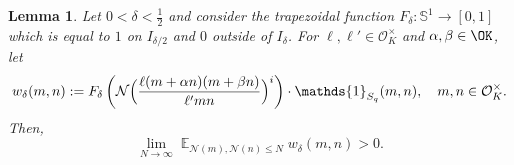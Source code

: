 \documentclass[11pt]{amsart}
\newtheorem{lemma}{Lemma}[section]
\theoremstyle{definition}
\DeclareMathOperator*{\E}{\mathbb{E}}
\newcommand{\NN}{{\mathcal N}}
\renewcommand{\S}{\mathbb{S}}
\begin{document}
\begin{lemma}\label{weights}
Let $0<\delta<\frac{1}{2}$ and consider the trapezoidal function $F_{\delta}: \S^1 \to [0,1]$ which is equal to $1$ on $I_{\delta/2}$ and $0$ outside of $I_{\delta}$. For $\ell,\ell' \in \mathcal{O}_K^{\times}$ and $\alpha,\beta \in \OK$, let
\begin{equation}\label{weight1}
w_{\delta}(m,n):= F_{\delta}\left(\NN\Bigl(\frac{\ell (m+\alpha n)(m+\beta n)}{\ell' mn}\Bigr)^i \right)\cdot \mathds{1}_{S_q}(m,n), \quad m, n \in \mathcal{O}_K^{\times}.
\end{equation}
Then,
\begin{equation}\label{weight2}
\lim_{N \to \infty} \E_{\NN(m), \NN(n) \leq N } w_{\delta}(m,n)>0.
\end{equation}
\end{lemma}
\end{document}
